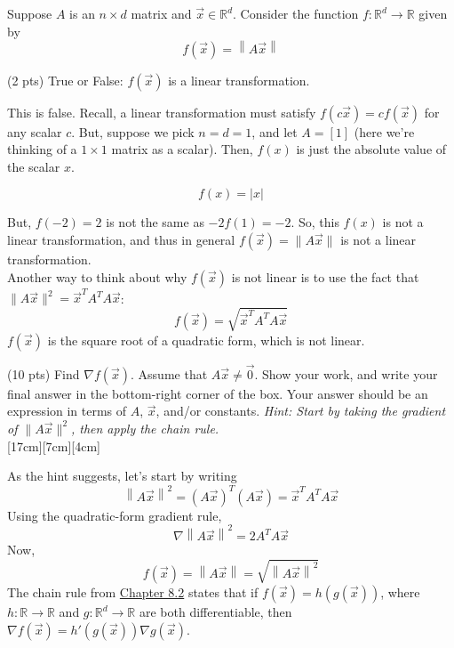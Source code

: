 \documentclass[11pt]{article}
\begin{document}
\begin{prob}[(12 pts)]
Suppose $A$ is an $n \times d$ matrix and $\vec x \in \mathbb{R}^d$. Consider the function $f: \mathbb{R}^d \to \mathbb{R}$ given by
$$
f(\vec x) = \left\|A\vec x\right\|
$$

\begin{subprob}(2 pts)
True or False: $f(\vec x)$ is a linear transformation.

 

\begin{solution}
This is false. Recall, a linear transformation must satisfy $f(c \vec x) = c f(\vec x)$ for any scalar $c$. But, suppose we pick $n = d = 1$, and let $A = [1]$ (here we're thinking of a $1 \times 1$ matrix as a scalar). Then, $f(x)$ is just the absolute value of the scalar $x$.

$$f(x) = |x|$$

But, $f(-2) = 2$ is not the same as $-2 f(1) = -2$. So, this $f(x)$ is not a linear transformation, and thus in general $f(\vec x) = \lVert A \vec x \rVert$ is not a linear transformation. \\

Another way to think about why $f(\vec x)$ is not linear is to use the fact that $\lVert A \vec x \rVert^2 = \vec x^T A^T A \vec x$:
$$f(\vec x) = \sqrt{\vec x^T A^T A \vec x}$$
$f(\vec x)$ is the square root of a quadratic form, which is not linear.

\end{solution}
\end{subprob}

\begin{subprob}(10 pts)
Find $\nabla f(\vec x)$. Assume that $A \vec x \neq \vec 0$. Show your work, and write your final answer in the bottom-right corner of the box. Your answer should be an expression in terms of $A$, $\vec x$, and/or constants. \textit{Hint: Start by taking the gradient of $\lVert A \vec x \rVert^2$, then apply the chain rule.} \\

[17cm][7cm][4cm]

\begin{solution}
As the hint suggests, let's start by writing
\[
\left\|A\vec x\right\|^2
=
(A\vec x)^T(A\vec x)
=
\vec x^T A^T A \vec x
\]
Using the quadratic-form gradient rule,
\[
\nabla \left\|A\vec x\right\|^2 = 2A^TA\vec x
\]
Now,
\[
f(\vec x) = \left\|A\vec x\right\|
=
\sqrt{\left\|A\vec x\right\|^2}
\]
The chain rule from \href{https://notes.eecs245.org/gradients/gradients-matrix-vector-operations/\#chain-rule-for-vector-to-scalar-functions}{Chapter 8.2} states that if $f(\vec x) = h(g(\vec x))$, where $h: \mathbb{R} \to \mathbb{R}$ and $g: \mathbb{R}^d \to \mathbb{R}$ are both differentiable, then $\nabla f(\vec x) = h'(g(\vec x)) \nabla g(\vec x)$. \\


\end{solution}
\end{subprob}
\end{prob}
\end{document}
